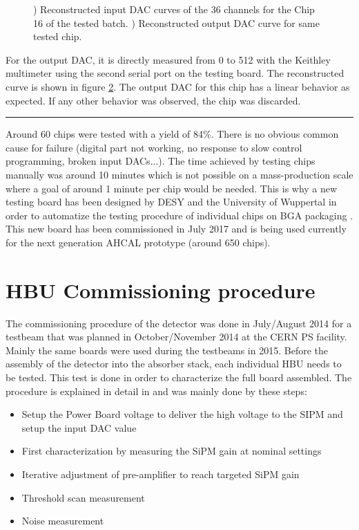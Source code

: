 \begin{figure}[htbp!]
\begin{subfigure}[t]{0.49\textwidth}
    \caption{} \label{fig:OutDAC}
  \end{subfigure}
  \caption{) Reconstructed input DAC curves of the 36 channels for the Chip 16 of the tested batch. ) Reconstructed output DAC curve for same tested chip.}
\end{figure}

For the output DAC, it is directly measured from 0 to 512 with the Keithley multimeter using the second serial port on the testing board. The reconstructed curve is shown in figure \ref{fig:OutDAC}. The output DAC for this chip has a linear behavior as expected. If any other behavior was observed, the chip was discarded.

\begin{center}
  \rule{0.5\textwidth}{.4pt}
\end{center}

Around 60 chips were tested with a yield of 84\%. There is no obvious common cause for failure (digital part not working, no response to slow control programming, broken input DACs...). The time achieved by testing chips manually was around 10 minutes which is not possible on a mass-production scale where a goal of around 1 minute per chip would be needed. This is why a new testing board has been designed by DESY and the University of Wuppertal in order to automatize the testing procedure of individual chips on BGA packaging \cite{AHCALMain2016_Amine}. This new board has been commissioned in July 2017 and is being used currently for the next generation AHCAL prototype (around 650 chips).

\section{HBU Commissioning procedure}

The commissioning procedure of the detector was done in July/August 2014 for a testbeam that was planned in October/November 2014 at the CERN PS facility. Mainly the same boards were used during the testbeams in 2015. Before the assembly of the detector into the absorber stack, each individual HBU needs to be tested. This test is done in order to characterize the full board assembled. The procedure is explained in detail in \cite{Hartbrich2012} and was mainly done by these steps:

\begin{itemize}
  \item Setup the Power Board voltage to deliver the high voltage to the SIPM and setup the input DAC value
  \item First characterization by measuring the SiPM gain at nominal settings
  \item Iterative adjustment of pre-amplifier to reach targeted SiPM gain
  \item Threshold scan measurement
  \item Noise measurement
\end{itemize}

